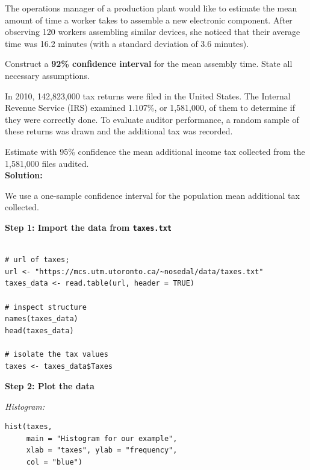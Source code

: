 \begin{example}

The operations manager of a production plant would like to estimate the mean amount of time a worker takes to assemble a new electronic component. After observing 120 workers assembling similar devices, she noticed that their average time was 16.2 minutes (with a standard deviation of 3.6 minutes).

Construct a \textbf{92\% confidence interval} for the mean assembly time. State all necessary assumptions.

\end{example}
\begin{example}

In 2010, 142,823,000 tax returns were filed in the United States. The Internal Revenue Service (IRS) examined 1.107\%, or 1,581,000, of them to determine if they were correctly done. To evaluate auditor performance, a random sample of these returns was drawn and the additional tax was recorded.

Estimate with 95\% confidence the mean additional income tax collected from the 1,581,000 files audited.\\



\textbf{Solution:}

We use a one-sample confidence interval for the population mean additional tax collected.

\textbf{Step 1: Import the data from \texttt{taxes.txt}}

\begin{tcolorbox}[colback=gray!10, colframe=black!45, arc=2mm]
\begin{verbatim}

# url of taxes;
url <- "https://mcs.utm.utoronto.ca/~nosedal/data/taxes.txt"
taxes_data <- read.table(url, header = TRUE)

# inspect structure
names(taxes_data)
head(taxes_data)

# isolate the tax values
taxes <- taxes_data$Taxes
\end{verbatim}
\end{tcolorbox}

\vspace{1em}
\textbf{Step 2: Plot the data}

\textit{Histogram:}
\begin{tcolorbox}[colback=gray!10, colframe=black!45, arc=2mm]
\begin{verbatim}
hist(taxes,
     main = "Histogram for our example",
     xlab = "taxes", ylab = "frequency",
     col = "blue")
\end{verbatim}
\end{tcolorbox}


\end{example}
